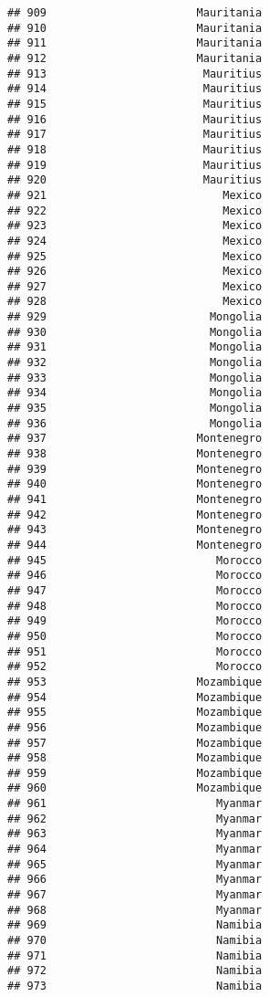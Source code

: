 \documentclass[]{article}
\begin{document}
\begin{verbatim}
## 909                       Mauritania
## 910                       Mauritania
## 911                       Mauritania
## 912                       Mauritania
## 913                        Mauritius
## 914                        Mauritius
## 915                        Mauritius
## 916                        Mauritius
## 917                        Mauritius
## 918                        Mauritius
## 919                        Mauritius
## 920                        Mauritius
## 921                           Mexico
## 922                           Mexico
## 923                           Mexico
## 924                           Mexico
## 925                           Mexico
## 926                           Mexico
## 927                           Mexico
## 928                           Mexico
## 929                         Mongolia
## 930                         Mongolia
## 931                         Mongolia
## 932                         Mongolia
## 933                         Mongolia
## 934                         Mongolia
## 935                         Mongolia
## 936                         Mongolia
## 937                       Montenegro
## 938                       Montenegro
## 939                       Montenegro
## 940                       Montenegro
## 941                       Montenegro
## 942                       Montenegro
## 943                       Montenegro
## 944                       Montenegro
## 945                          Morocco
## 946                          Morocco
## 947                          Morocco
## 948                          Morocco
## 949                          Morocco
## 950                          Morocco
## 951                          Morocco
## 952                          Morocco
## 953                       Mozambique
## 954                       Mozambique
## 955                       Mozambique
## 956                       Mozambique
## 957                       Mozambique
## 958                       Mozambique
## 959                       Mozambique
## 960                       Mozambique
## 961                          Myanmar
## 962                          Myanmar
## 963                          Myanmar
## 964                          Myanmar
## 965                          Myanmar
## 966                          Myanmar
## 967                          Myanmar
## 968                          Myanmar
## 969                          Namibia
## 970                          Namibia
## 971                          Namibia
## 972                          Namibia
## 973                          Namibia

\end{verbatim}
\end{document}
